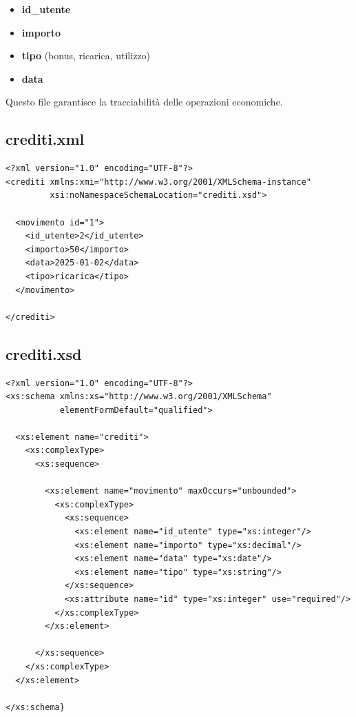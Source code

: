 \documentclass[a4paper,12pt]{report}
\begin{document}
\begin{itemize}
    \item \textbf{id\_utente}
    \item \textbf{importo}
    \item \textbf{tipo} (bonus, ricarica, utilizzo)
    \item \textbf{data}
\end{itemize}

Questo file garantisce la tracciabilità delle operazioni economiche.


\subsection*{crediti.xml}

{\footnotesize
\begin{lstlisting}
<?xml version="1.0" encoding="UTF-8"?>
<crediti xmlns:xmi="http://www.w3.org/2001/XMLSchema-instance"
         xsi:noNamespaceSchemaLocation="crediti.xsd">

  <movimento id="1">
    <id_utente>2</id_utente>
    <importo>50</importo>
    <data>2025-01-02</data>
    <tipo>ricarica</tipo>
  </movimento>

</crediti>
\end{lstlisting}
}

\subsection*{crediti.xsd}

{\footnotesize
\begin{lstlisting}
<?xml version="1.0" encoding="UTF-8"?>
<xs:schema xmlns:xs="http://www.w3.org/2001/XMLSchema"
           elementFormDefault="qualified">

  <xs:element name="crediti">
    <xs:complexType>
      <xs:sequence>

        <xs:element name="movimento" maxOccurs="unbounded">
          <xs:complexType>
            <xs:sequence>
              <xs:element name="id_utente" type="xs:integer"/>
              <xs:element name="importo" type="xs:decimal"/>
              <xs:element name="data" type="xs:date"/>
              <xs:element name="tipo" type="xs:string"/>
            </xs:sequence>
            <xs:attribute name="id" type="xs:integer" use="required"/>
          </xs:complexType>
        </xs:element>

      </xs:sequence>
    </xs:complexType>
  </xs:element>

</xs:schema}
\end{lstlisting}
}
\end{document}
